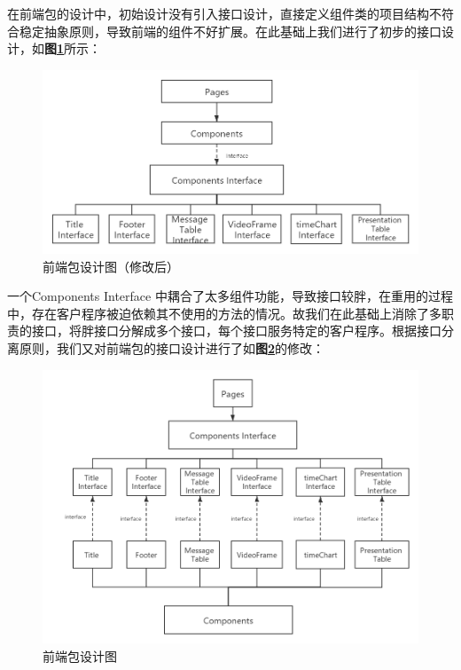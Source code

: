 \documentclass[article]{BJTU-thesis}
\begin{document}
\newpage
在前端包的设计中，初始设计没有引入接口设计，直接定义组件类的项目结构不符合稳定抽象原则，导致前端的组件不好扩展。在此基础上我们进行了初步的接口设计，如\textbf{图\ref{fig:fig13}}所示：

\begin{figure}[!htbp]
	\centering
	\includegraphics[scale=0.4]{img/13.png}
	\caption{前端包设计图（修改后）}\label{fig:fig13}
\end{figure}

一个Components Interface 中耦合了太多组件功能，导致接口较胖，在重用的过程中，存在客户程序被迫依赖其不使用的方法的情况。故我们在此基础上消除了多职责的接口，将胖接口分解成多个接口，每个接口服务特定的客户程序。根据接口分离原则，我们又对前端包的接口设计进行了如\textbf{图\ref{fig:fig14}}的修改：

\begin{figure}[!htbp]
	\centering
	\includegraphics[scale=0.4]{img/12.png}
	\caption{前端包设计图}\label{fig:fig14}
\end{figure}
\end{document}
